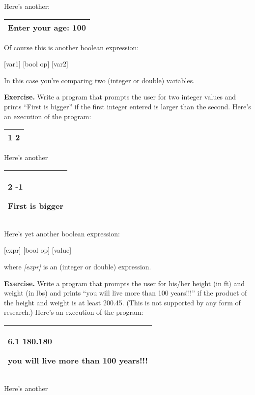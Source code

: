 \documentclass[
]{article}
\begin{document}
Here's another:

\begin{longtable}[]{@{}l@{}}
\toprule
\endhead
Enter your age: \textbf{100}\tabularnewline
\bottomrule
\end{longtable}

Of course this is another boolean expression:

{[}var1{]} {[}bool op{]} {[}var2{]}

In this case you're comparing two (integer or double) variables.

\textbf{Exercise.} Write a program that prompts the user for two integer
values and prints ``First is bigger'' if the first integer entered is
larger than the second. Here's an execution of the program:

\begin{longtable}[]{@{}l@{}}
\toprule
\endhead
1 2\tabularnewline
\bottomrule
\end{longtable}

Here's another

\begin{longtable}[]{@{}l@{}}
\toprule
\endhead
\begin{minipage}[t]{0.97\columnwidth}\raggedright
2 -1

First is bigger\strut
\end{minipage}\tabularnewline
\bottomrule
\end{longtable}

Here's yet another boolean expression:

{[}expr{]} {[}bool op{]} {[}value{]}

where \emph{{[}expr{]}} is an (integer or double) expression.

\textbf{Exercise.} Write a program that prompts the user for his/her
height (in ft) and weight (in lbs) and prints ``you will live more than
100 years!!!'' if the product of the height and weight is at least
200.45. (This is not supported by any form of research.) Here's an
execution of the program:

\begin{longtable}[]{@{}l@{}}
\toprule
\endhead
\begin{minipage}[t]{0.97\columnwidth}\raggedright
6.1 180.180

you will live more than 100 years!!!\strut
\end{minipage}\tabularnewline
\bottomrule
\end{longtable}

Here's another
\end{document}
